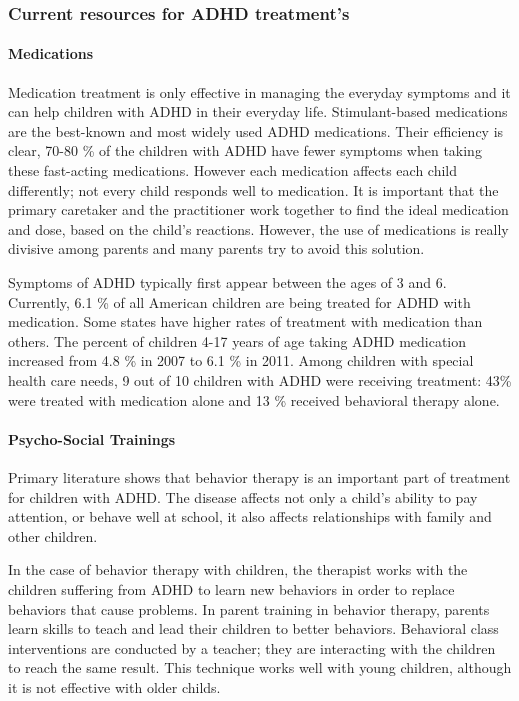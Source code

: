 \documentclass[letterpaper,10pt]{article}
\begin{document}
\subsubsection{Current resources for ADHD treatment's}

\paragraph{Medications}

Medication treatment is only effective in managing the everyday symptoms and it can help children with ADHD in their everyday life. Stimulant-based medications are the best-known and most widely used ADHD medications. Their efficiency is clear, 70-80 \% of the children with ADHD have fewer symptoms when taking these fast-acting medications. However each medication affects each child differently; not every child responds well to medication. It is important that the primary caretaker and the practitioner work together to find the ideal medication and dose, based on the child's reactions. \cite{adhd_general} However, the use of medications is really divisive among parents and many parents try to avoid this solution.

Symptoms of ADHD typically first appear between the ages of 3 and 6. Currently, 6.1 \% of all American children are being treated for ADHD with medication. Some states have higher rates of treatment with medication than others. \cite{healthline_adhd}
The percent of children 4-17 years of age taking ADHD medication increased from 4.8 \% in 2007 to 6.1 \% in 2011. Among children with special health care needs, 9 out of 10 children with ADHD were receiving treatment: 43\% were treated with medication alone and 13 \% received behavioral therapy alone. \cite{adhd_general}


\paragraph{Psycho-Social Trainings} 

Primary literature shows that behavior therapy is an important part of treatment for children with ADHD. The disease affects not only a child’s ability to pay attention, or behave well at school, it also affects relationships with family and other children. 

In the case of behavior therapy with children, the therapist works with the children suffering from ADHD to learn new behaviors in order to replace behaviors that cause problems. In parent training in behavior therapy, parents learn skills to teach and lead their children to better behaviors.\cite{adhd_general} Behavioral class interventions are conducted by a teacher; they are interacting with the children to reach the same result. This technique works well with young children, although it is not effective with older childs.
\end{document}
